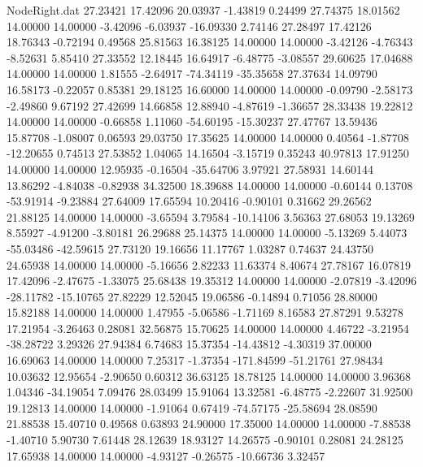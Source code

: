 \begin{filecontents}{NodeRight.dat}
  27.23421   17.42096   20.03937    -1.43819    0.24499   27.74375   18.01562   14.00000   14.00000   -3.42096   -6.03937  -16.09330    2.74146
  27.28497   17.42126   18.76343    -0.72194    0.49568   25.81563   16.38125   14.00000   14.00000   -3.42126   -4.76343   -8.52631    5.85410
  27.33552   12.18445   16.64917    -6.48775   -3.08557   29.60625   17.04688   14.00000   14.00000    1.81555   -2.64917  -74.34119  -35.35658
  27.37634   14.09790   16.58173    -0.22057    0.85381   29.18125   16.60000   14.00000   14.00000   -0.09790   -2.58173   -2.49860    9.67192
  27.42699   14.66858   12.88940    -4.87619   -1.36657   28.33438   19.22812   14.00000   14.00000   -0.66858    1.11060  -54.60195  -15.30237
  27.47767   13.59436   15.87708    -1.08007    0.06593   29.03750   17.35625   14.00000   14.00000    0.40564   -1.87708  -12.20655    0.74513
  27.53852    1.04065   14.16504    -3.15719    0.35243   40.97813   17.91250   14.00000   14.00000   12.95935   -0.16504  -35.64706    3.97921
  27.58931   14.60144   13.86292    -4.84038   -0.82938   34.32500   18.39688   14.00000   14.00000   -0.60144    0.13708  -53.91914   -9.23884
  27.64009   17.65594   10.20416    -0.90101    0.31662   29.26562   21.88125   14.00000   14.00000   -3.65594    3.79584  -10.14106    3.56363
  27.68053   19.13269    8.55927    -4.91200   -3.80181   26.29688   25.14375   14.00000   14.00000   -5.13269    5.44073  -55.03486  -42.59615
  27.73120   19.16656   11.17767     1.03287    0.74637   24.43750   24.65938   14.00000   14.00000   -5.16656    2.82233   11.63374    8.40674
  27.78167   16.07819   17.42096    -2.47675   -1.33075   25.68438   19.35312   14.00000   14.00000   -2.07819   -3.42096  -28.11782  -15.10765
  27.82229   12.52045   19.06586    -0.14894    0.71056   28.80000   15.82188   14.00000   14.00000    1.47955   -5.06586   -1.71169    8.16583
  27.87291    9.53278   17.21954    -3.26463    0.28081   32.56875   15.70625   14.00000   14.00000    4.46722   -3.21954  -38.28722    3.29326
  27.94384    6.74683   15.37354   -14.43812   -4.30319   37.00000   16.69063   14.00000   14.00000    7.25317   -1.37354 -171.84599  -51.21761
  27.98434   10.03632   12.95654    -2.90650    0.60312   36.63125   18.78125   14.00000   14.00000    3.96368    1.04346  -34.19054    7.09476
  28.03499   15.91064   13.32581    -6.48775   -2.22607   31.92500   19.12813   14.00000   14.00000   -1.91064    0.67419  -74.57175  -25.58694
  28.08590   21.88538   15.40710     0.49568    0.63893   24.90000   17.35000   14.00000   14.00000   -7.88538   -1.40710    5.90730    7.61448
  28.12639   18.93127   14.26575    -0.90101    0.28081   24.28125   17.65938   14.00000   14.00000   -4.93127   -0.26575  -10.66736    3.32457

\end{filecontents}
